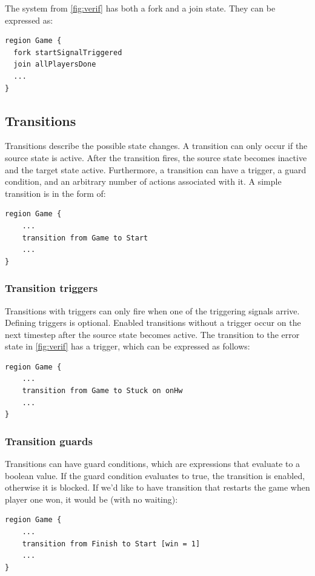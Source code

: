 The system from \cref{fig:verif} has both a fork and a join state. They can be expressed as:

\begin{lstlisting}
region Game {
  fork startSignalTriggered
  join allPlayersDone
  ...
}
\end{lstlisting}

  \subsection{Transitions}
Transitions describe the possible state changes. A transition can only occur if the source state is active. After the transition fires, the source state becomes inactive and the target state active. Furthermore, a transition can have a trigger, a guard condition, and an arbitrary number of actions associated with it. A simple transition is in the form of:

\begin{lstlisting}
region Game {
	...
	transition from Game to Start
	...
}
\end{lstlisting}

    \subsubsection{Transition triggers}
Transitions with triggers can only fire when one of the triggering signals arrive. Defining triggers is optional. Enabled transitions without a trigger occur on the next timestep after the source state becomes active. The transition to the error state in \cref{fig:verif} has a trigger, which can be expressed as follows:

\begin{lstlisting}
region Game {
	...
	transition from Game to Stuck on onHw
	...
}
\end{lstlisting}

    \subsubsection{Transition guards}
Transitions can have guard conditions, which are expressions that evaluate to a boolean value. If the guard condition evaluates to true, the transition is enabled, otherwise it is blocked. If we'd like to have transition that restarts the game when player one won, it would be (with no waiting):

\begin{lstlisting}
region Game {
	...
	transition from Finish to Start [win = 1]
	...
}
\end{lstlisting}

